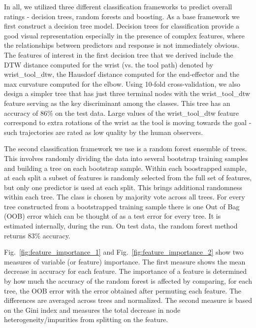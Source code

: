 \documentclass[letterpaper, 10 pt, conference]{ieeeconf}  %
\begin{document}
In all, we utilized three different classification frameworks to predict overall ratings - decision trees, random forests and boosting. As a base framework we first construct a decision tree model.  Decision trees for classification provide a good visual representation especially in the presence of complex features, where the relationships between predictors and response is not immediately obvious. The features of interest in the first decision tree that we derived include the DTW distance computed for the wrist (vs. the tool path) denoted by wrist\_tool\_dtw, the Hausdorf distance computed for the end-effector and the max curvature computed for the elbow. Using 10-fold cross-validation, we also design a simpler tree that has just three terminal nodes with the wrist\_tool\_dtw feature serving as the key discriminant among the classes. This tree has an accuracy of 86\% on the test data. Large values of the wrist\_tool\_dtw feature correspond to extra rotations of the wrist as the tool is moving towards the goal - such trajectories are rated as low quality by the human observers. 

The second classification framework we use is a random forest ensemble of trees. This involves randomly dividing the data into several bootstrap training samples and building a tree on each bootstrap sample. Within each boostrapped sample, at each split a subset of features is randomly selected from the full set of features, but only one predictor is used at each split. This brings additional randomness within each tree. The class is chosen by majority vote across all trees. For every tree constructed from a bootstrapped training sample there is one Out of Bag (OOB) error which can be thought of as a test error for every tree. It is estimated internally, during the run. On test data, the random forest method returns 83\% accuracy. 

Fig.~\ref{fig:feature_importance_1} and Fig.~\ref{fig:feature_importance_2} show two measures of variable (or feature) importance. The first measure shows the mean decrease in accuracy for each feature. The importance of a feature is determined by how much the accuracy of the random forest is affected by comparing, for each tree, the OOB error with the error obtained after permuting each feature. The differences are averaged across trees and normalized.  The second measure is based on the Gini index and measures the total decrease in node heterogeneity/impurities from splitting on the feature.  
\end{document}
